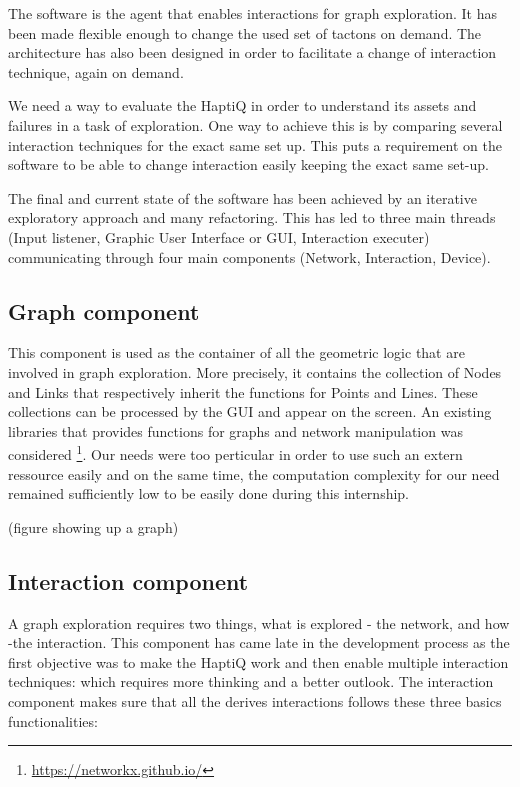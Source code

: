 The software is the agent that enables interactions for graph
exploration. It has been made flexible enough to change the used set of
tactons on demand. The architecture has also been designed in order to
facilitate a change of interaction technique, again on demand.

We need a way to evaluate the HaptiQ in order to understand its assets
and failures in a task of exploration. One way to achieve this is by
comparing several interaction techniques for the exact same set up. This
puts a requirement on the software to be able to change interaction
easily keeping the exact same set-up.

The final and current state of the software has been achieved by an
iterative exploratory approach and many refactoring. This has led to
three main threads (Input listener, Graphic User Interface or GUI,
Interaction executer) communicating through four main components
(Network, Interaction, Device).

\subsection{Graph component}\label{graph-component}

This component is used as the container of all the geometric logic that
are involved in graph exploration. More precisely, it contains the
collection of Nodes and Links that respectively inherit the functions
for Points and Lines. These collections can be processed by the GUI and
appear on the screen. An existing libraries that provides functions for
graphs and network manipulation was considered \footnote{\url{https://networkx.github.io/}}.
Our needs were too perticular in order to use such an extern ressource
easily and on the same time, the computation complexity for our need
remained sufficiently low to be easily done during this internship.

(figure showing up a graph)

\subsection{Interaction component}\label{interaction-component}

A graph exploration requires two things, what is explored - the network,
and how -the interaction. This component has came late in the
development process as the first objective was to make the HaptiQ work
and then enable multiple interaction techniques: which requires more
thinking and a better outlook. The interaction component makes sure that
all the derives interactions follows these three basics functionalities:

